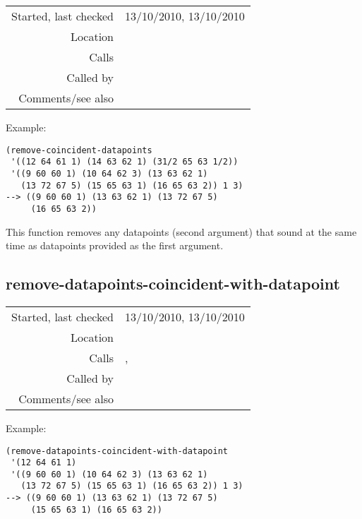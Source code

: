 \vspace{0.3cm}
\begin{tabular}{r|p{8cm}}
Started, last checked & 13/10/2010, 13/10/2010 \\
Location & \nameref{sec:generating-beat-MNN-spacing-for-and-back} \\
Calls & \nameref{fun:remove-datapoints-coincident-with-datapoint} \\
Called by & \nameref{fun:unite-datapoints} \\
Comments/see also &
\end{tabular}

\vspace{0.5cm}
\noindent Example:
\begin{verbatim}
(remove-coincident-datapoints
 '((12 64 61 1) (14 63 62 1) (31/2 65 63 1/2))
 '((9 60 60 1) (10 64 62 3) (13 63 62 1)
   (13 72 67 5) (15 65 63 1) (16 65 63 2)) 1 3)
--> ((9 60 60 1) (13 63 62 1) (13 72 67 5)
     (16 65 63 2))
\end{verbatim}

This function removes any datapoints (second argument)
that sound at the same time as datapoints provided as
the first argument.


\subsection*{remove-datapoints-coincident-with-datapoint}\label{fun:remove-datapoints-coincident-with-datapoint}

\vspace{0.3cm}
\begin{tabular}{r|p{8cm}}
Started, last checked & 13/10/2010, 13/10/2010 \\
Location & \nameref{sec:generating-beat-MNN-spacing-for-and-back} \\
Calls & \nameref{fun:append-offtimes}, \nameref{fun:my-last} \\
Called by & \nameref{fun:remove-coincident-datapoints} \\
Comments/see also &
\end{tabular}

\vspace{0.5cm}
\noindent Example:
\begin{verbatim}
(remove-datapoints-coincident-with-datapoint
 '(12 64 61 1)
 '((9 60 60 1) (10 64 62 3) (13 63 62 1)
   (13 72 67 5) (15 65 63 1) (16 65 63 2)) 1 3)
--> ((9 60 60 1) (13 63 62 1) (13 72 67 5)
     (15 65 63 1) (16 65 63 2))
\end{verbatim}

